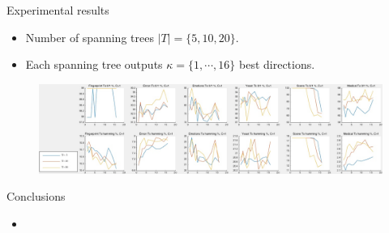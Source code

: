 \documentclass[first=dgreen,second=purple,logo=yellowexc]{aaltoslides}
\begin{document}
\begin{frame}{Experimental results}
	\begin{itemize}\footnotesize
		\item Number of spanning trees $|T|=\{5,10,20\}$.
		\item Each spanning tree outputs $\kappa=\{1,\cdots,16\}$ best directions.
	\end{itemize}
	\begin{figure}
		\begin{center}
			\includegraphics[scale=0.22]{./slide_overall_test.jpg}
		\end{center}
	\end{figure}
\end{frame}






%
\begin{frame}{Conclusions}
	\begin{itemize}\footnotesize
		\item 
	\end{itemize}
\end{frame}

\end{document}
